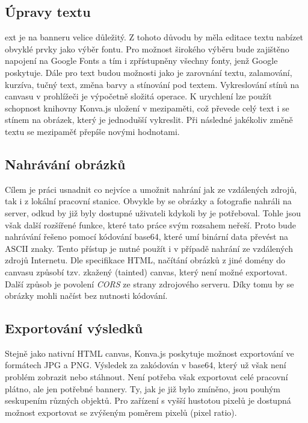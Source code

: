         \subsection{Úpravy textu}
        ext je na banneru velice důležitý. Z tohoto důvodu by měla editace textu nabízet obvyklé prvky jako výběr fontu.
        Pro možnost širokého výběru bude zajištěno napojení na Google Fonts a tím i zpřístupněny všechny fonty, jenž Google poskytuje.
        Dále pro text budou možnosti jako je zarovnání textu, zalamování, kurzíva, tučný text, změna barvy a stínování pod textem.
        Vykreslování stínů na canvasu v prohlížeči je výpočetně složitá operace. K urychlení lze použít schopnost knihovny Konva.js uložení v mezipaměti,
        což převede celý text i se stínem na obrázek,
        který je jednodušší vykreslit. Při následné jakékoliv změně textu se mezipaměť přepíše novými hodnotami.

        \subsection{Nahrávání obrázků}
        Cílem je práci usnadnit co nejvíce a umožnit nahrání jak ze vzdálených zdrojů, tak i z lokální pracovní stanice.
        Obvykle by se obrázky a fotografie nahráli na server, odkud by již byly dostupné uživateli kdykoli by je potřeboval.
        Tohle jsou však další rozšířené funkce, které tato práce svým rozsahem neřeší. Proto bude nahrávání řešeno pomocí kódování base64,
        které umí binární data převést na ASCII znaky. Tento přístup je nutné použít i v případě nahrání ze vzdálených zdrojů Internetu.
        Dle specifikace HTML, načítání obrázků z jiné domény do canvasu způsobí tzv. zkažený (tainted) canvas, který není možné exportovat.
        Další způsob je povolení \emph{CORS} ze strany zdrojového serveru. Díky tomu by se obrázky mohli načíst bez nutnosti kódování.

        \subsection{Exportování výsledků}
        Stejně jako nativní HTML canvas, Konva.js poskytuje možnost exportování ve formátech JPG a PNG.
        Výsledek za zakódován v base64, který už však není problém zobrazit nebo stáhnout.
        Není potřeba však exportovat celé pracovní plátno, ale jen potřebné bannery. Ty, jak je již bylo zmíněno,
        jsou pouhým seskupením různých objektů. Pro zařízení s vyšší hustotou pixelů je dostupná možnost exportovat se zvýšeným poměrem pixelů (pixel ratio). 

